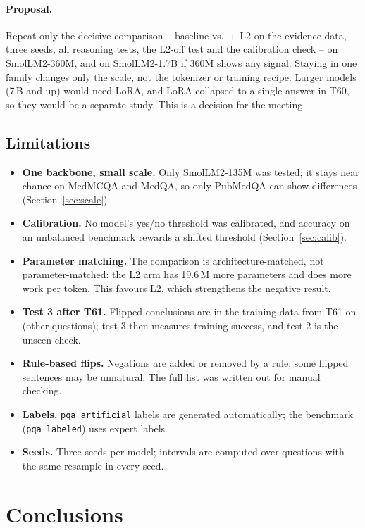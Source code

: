 \documentclass[a4paper,11pt,parskip=half]{scrartcl}
\newcommand{\code}[1]{\texttt{\small #1}}
\begin{document}
\paragraph{Proposal.} Repeat only the decisive comparison -- baseline vs.\ + L2 on the evidence data, three seeds, all reasoning tests, the L2-off test and the calibration check -- on SmolLM2-360M, and on SmolLM2-1.7B if 360M shows any signal. Staying in one family changes only the scale, not the tokenizer or training recipe. Larger models (7\,B and up) would need LoRA, and LoRA collapsed to a single answer in T60, so they would be a separate study. This is a decision for the meeting.

\subsection{Limitations}
\begin{itemize}
  \item \textbf{One backbone, small scale.} Only SmolLM2-135M was tested; it stays near chance on MedMCQA and MedQA, so only PubMedQA can show differences (Section~\ref{sec:scale}).
  \item \textbf{Calibration.} No model's yes/no threshold was calibrated, and accuracy on an unbalanced benchmark rewards a shifted threshold (Section~\ref{sec:calib}).
  \item \textbf{Parameter matching.} The comparison is architecture-matched, not parameter-matched: the L2 arm has 19.6\,M more parameters and does more work per token. This favours L2, which strengthens the negative result.
  \item \textbf{Test 3 after T61.} Flipped conclusions are in the training data from T61 on (other questions); test 3 then measures training success, and test 2 is the unseen check.
  \item \textbf{Rule-based flips.} Negations are added or removed by a rule; some flipped sentences may be unnatural. The full list was written out for manual checking.
  \item \textbf{Labels.} \code{pqa\_artificial} labels are generated automatically; the benchmark (\code{pqa\_labeled}) uses expert labels.
  \item \textbf{Seeds.} Three seeds per model; intervals are computed over questions with the same resample in every seed.
\end{itemize}

\section{Conclusions}
\end{document}

